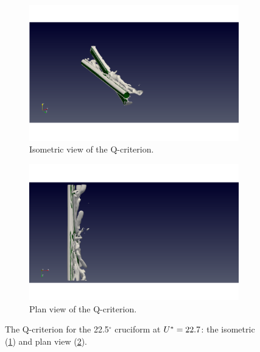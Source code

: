 \documentclass[oneside]{utmthesis}
\begin{document}
\begin{figure}[H]
  \centering
  \begin{subfigure}[h]{0.48\textwidth}
    \includegraphics[width=\textwidth,trim={1.5cm 0 3cm 0},clip]{figs/qIso225U10}
    \caption{Isometric view of the Q-criterion.}
    \label{fig:qIso225U10}
  \end{subfigure}
  \hfill
  \begin{subfigure}[h]{0.48\textwidth}
    \includegraphics[width=\textwidth,trim={1.5cm 0 3cm 0},clip]{figs/qTop225U10}
    \caption{Plan view of the Q-criterion.}
    \label{fig:qTop225U10}
  \end{subfigure}

  \caption{The Q-criterion for the 22.5$^{\circ}$ cruciform at $U^{*} = 22.7$: the isometric (\ref{fig:qIso225U10}) and plan view (\ref{fig:qTop225U10}).} \label{fig:qCrit225U10}
\end{figure}
\end{document}

